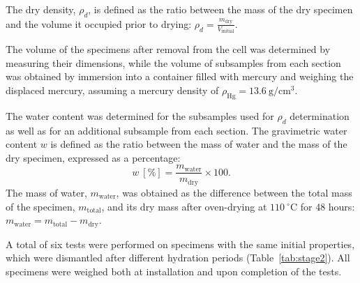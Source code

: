 The dry density, \(\rho_d\), is defined as the ratio between the mass of the dry specimen and the volume it occupied prior to drying:
$\rho_d = \frac{m_{\mathrm{dry}}}{V_{\mathrm{initial}}}$.

The volume of the specimens after removal from the cell was determined by measuring their dimensions, while the volume of subsamples from each section was obtained by immersion into a container filled with mercury and weighing the displaced mercury, assuming a mercury density of
$\rho_{\mathrm{Hg}} = 13.6 \ \mathrm{g/cm^3}$.

The water content was determined for the subsamples used for \(\rho_d\) determination as well as for an additional subsample from each section. The gravimetric water content \(w\) is defined as the ratio between the mass of water and the mass of the dry specimen, expressed as a percentage:
\[
w \ [\%] = \frac{m_{\mathrm{water}}}{m_{\mathrm{dry}}} \times 100.
\]
The mass of water, \(m_{\mathrm{water}}\), was obtained as the difference between the total mass of the specimen, \(m_{\mathrm{total}}\), and its dry mass after oven-drying at \(110 \ ^\circ\mathrm{C}\) for 48 hours:
$m_{\mathrm{water}} = m_{\mathrm{total}} - m_{\mathrm{dry}}$.

A total of six tests were performed on specimens with the same initial properties, which were dismantled after different hydration periods (Table~\ref{tab:stage2}). All specimens were weighed both at installation and upon completion of the tests.


\begin{table}[!htbp]
\centering
\caption{Initial and final characteristics of Stage 2 tests with hydration from the bottom.}
\label{tab:stage2}
\end{table}

